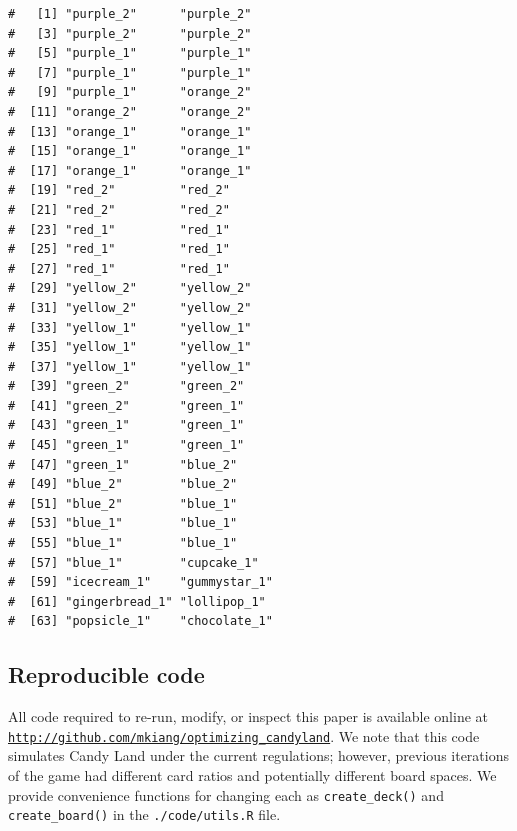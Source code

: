 \documentclass[letterpaper,9pt,twocolumn,twoside,]{pinp}
\begin{document}
\begin{ShadedResult}
\begin{verbatim}
#   [1] "purple_2"      "purple_2"     
#   [3] "purple_2"      "purple_2"     
#   [5] "purple_1"      "purple_1"     
#   [7] "purple_1"      "purple_1"     
#   [9] "purple_1"      "orange_2"     
#  [11] "orange_2"      "orange_2"     
#  [13] "orange_1"      "orange_1"     
#  [15] "orange_1"      "orange_1"     
#  [17] "orange_1"      "orange_1"     
#  [19] "red_2"         "red_2"        
#  [21] "red_2"         "red_2"        
#  [23] "red_1"         "red_1"        
#  [25] "red_1"         "red_1"        
#  [27] "red_1"         "red_1"        
#  [29] "yellow_2"      "yellow_2"     
#  [31] "yellow_2"      "yellow_2"     
#  [33] "yellow_1"      "yellow_1"     
#  [35] "yellow_1"      "yellow_1"     
#  [37] "yellow_1"      "yellow_1"     
#  [39] "green_2"       "green_2"      
#  [41] "green_2"       "green_1"      
#  [43] "green_1"       "green_1"      
#  [45] "green_1"       "green_1"      
#  [47] "green_1"       "blue_2"       
#  [49] "blue_2"        "blue_2"       
#  [51] "blue_2"        "blue_1"       
#  [53] "blue_1"        "blue_1"       
#  [55] "blue_1"        "blue_1"       
#  [57] "blue_1"        "cupcake_1"    
#  [59] "icecream_1"    "gummystar_1"  
#  [61] "gingerbread_1" "lollipop_1"   
#  [63] "popsicle_1"    "chocolate_1"
\end{verbatim}
\end{ShadedResult}

\hypertarget{reproducible-code}{%
\subsection{Reproducible code}\label{reproducible-code}}

All code required to re-run, modify, or inspect this paper is available
online at
\href{http://github.com/mkiang/optimizing_candyland}{\texttt{http://github.com/mkiang/optimizing\_candyland}}.
We note that this code simulates Candy Land under the current
regulations; however, previous iterations of the game had different card
ratios and potentially different board spaces. We provide convenience
functions for changing each as \texttt{create\_deck()} and
\texttt{create\_board()} in the \texttt{./code/utils.R} file.
\end{document}
